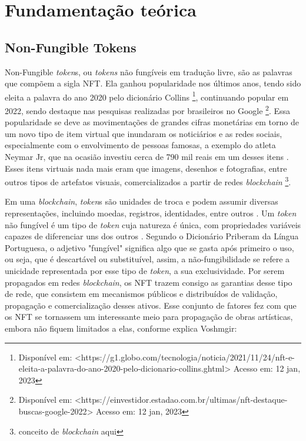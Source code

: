 \chapter{Fundamentação teórica}
\label{cap:fundamentacao-teorica}

\section{Non-Fungible Tokens}
\label{cap:non-fungible tokens}

Non-Fungible \textit{token}s, ou \textit{tokens} não fungíveis em tradução livre, são as palavras que compõem a sigla NFT. Ela ganhou popularidade nos últimos anos, tendo sido eleita a palavra do ano 2020 pelo dicionário Collins \footnote{Disponível em: <https://g1.globo.com/tecnologia/noticia/2021/11/24/nft-e-eleita-a-palavra-do-ano-2020-pelo-dicionario-collins.ghtml> Acesso em: 12 jan, 2023}, continuando popular em 2022, sendo destaque nas pesquisas realizadas por brasileiros no Google \footnote{Disponível em: <https://einvestidor.estadao.com.br/ultimas/nft-destaque-buscas-google-2022> Acesso em: 12 jan, 2023}. Essa popularidade se deve as movimentações de grandes cifras monetárias em torno de um novo tipo de item virtual que inundaram os noticiários e as redes sociais, especialmente com o envolvimento de pessoas famosas, a exemplo do atleta Neymar Jr, que na ocasião investiu cerca de 790 mil reais em um desses itens \cite{Andrade}. Esses itens virtuais nada mais eram que imagens, desenhos e fotografias, entre outros tipos de artefatos visuais, comercializados a partir de redes \textit{\textit{blockchain}} \footnote{conceito de \textit{blockchain} aqui}.

Em uma \textit{blockchain}, \textit{token}s são unidades de troca e podem assumir diversas representações, incluindo moedas, registros, identidades, entre outros \cite{Antonopoulos, Voshmgir}. Um \textit{token} não fungível é um tipo de \textit{token} cuja natureza é única, com propriedades variáveis capazes de diferenciar uns dos outros \cite{Voshmgir}. Segundo o Dicionário Priberam da Língua Portuguesa, o adjetivo "fungível" significa algo que se gasta após primeiro o uso, ou seja, que é descartável ou substituível, assim, a não-fungibilidade se refere a unicidade representada por esse tipo de \textit{token}, a sua exclusividade. Por serem propagados em redes \textit{blockchain}, os NFT trazem consigo as garantias desse tipo de rede, que consistem em mecanismos públicos e distribuídos de validação, propagação e comercialização desses ativos. Esse conjunto de fatores fez com que os NFT se tornassem um interessante meio para propagação de obras artísticas, embora não fiquem limitados a elas, conforme explica Voshmgir:

